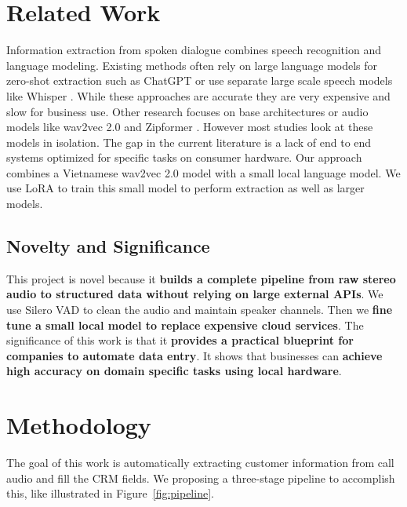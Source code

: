 \documentclass[unnumsec,webpdf,modern,large]{oup-authoring-template}%
\theoremstyle{thmstyleone}%
\theoremstyle{thmstyletwo}%
\theoremstyle{thmstylethree}%
\begin{document}
\section{Related Work} 
\label{sec:related-work}
Information extraction from spoken dialogue combines speech recognition and language modeling. Existing methods often rely on large language models for zero-shot extraction such as ChatGPT \cite{wei2023zero_shot_ie} or use separate large scale speech models like Whisper \cite{whisper_repo}. While these approaches are accurate they are very expensive and slow for business use. Other research focuses on base architectures \cite{vaswani2017attention} or audio models like wav2vec 2.0 \cite{baevski2020wav2vec2} and Zipformer \cite{zipformer_paper}. However most studies look at these models in isolation. The gap in the current literature is a lack of end to end systems optimized for specific tasks on consumer hardware. Our approach combines a Vietnamese wav2vec 2.0 model with a small local language model. We use LoRA \cite{hu2022lora} to train this small model to perform extraction as well as larger models.

\subsection{Novelty and Significance}
This project is novel because it \textbf{builds a complete pipeline from raw stereo audio to structured data without relying on large external APIs}. We use Silero VAD \cite{SileroVAD} to clean the audio and maintain speaker channels. Then we \textbf{fine tune a small local model to replace expensive cloud services}. The significance of this work is that it \textbf{provides a practical blueprint for companies to automate data entry}. It shows that businesses can \textbf{achieve high accuracy on domain specific tasks using local hardware}.

\section{Methodology} 
\label{sec:methodology} 

The goal of this work is automatically extracting customer information from call audio and fill the CRM fields. We proposing a three-stage pipeline to accomplish this, like illustrated in Figure~\ref{fig:pipeline}. 
\end{document}
